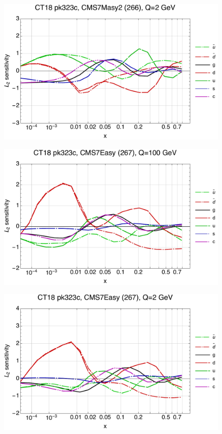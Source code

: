 \documentclass[10pt,aps,prd,floatfix,titlepage]{revtex4}
\begin{document}
\begin{figure}
\includegraphics[width=\textwidth,height=0.44\textheight,keepaspectratio]{1/266_ct18nn_L2_q2_Sf_1.pdf}
\caption{}
\end{figure}
\clearpage
\begin{figure}
\includegraphics[width=\textwidth,height=0.44\textheight,keepaspectratio]{1/267_ct18nn_L2_q100_Sf_1.pdf}
\caption{}
\end{figure}
\begin{figure}
\includegraphics[width=\textwidth,height=0.44\textheight,keepaspectratio]{1/267_ct18nn_L2_q2_Sf_1.pdf}
\caption{}
\end{figure}
\end{document}
